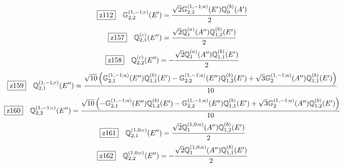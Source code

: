 \documentclass[fleqn,10pt,landscape]{jsarticle}
\begin{document}
\begin{dmath*}
\hspace*{3mm}\fbox{z112}\quad \mathbb{G}_{2,2}^{(1,-1;c)}(E^{\prime})=\frac{\sqrt{2} \mathbb{G}_{2,2}^{(1,-1;a)}(E^{\prime}) \mathbb{Q}_{0}^{(b)}(A^{\prime})}{2}
\end{dmath*}
\begin{dmath*}
\hspace*{3mm}\fbox{z157}\quad \mathbb{Q}_{2,1}^{(c)}(E^{\prime\prime})=\frac{\sqrt{2} \mathbb{Q}_{1}^{(a)}(A^{\prime\prime}) \mathbb{Q}_{1,2}^{(b)}(E^{\prime})}{2}
\end{dmath*}
\begin{dmath*}
\hspace*{3mm}\fbox{z158}\quad \mathbb{Q}_{2,2}^{(c)}(E^{\prime\prime})=- \frac{\sqrt{2} \mathbb{Q}_{1}^{(a)}(A^{\prime\prime}) \mathbb{Q}_{1,1}^{(b)}(E^{\prime})}{2}
\end{dmath*}
\begin{dmath*}
\hspace*{3mm}\fbox{z159}\quad \mathbb{Q}_{2,1}^{(1,-1;c)}(E^{\prime\prime})=\frac{\sqrt{10} \left(\mathbb{G}_{2,1}^{(1,-1;a)}(E^{\prime\prime}) \mathbb{Q}_{1,1}^{(b)}(E^{\prime}) - \mathbb{G}_{2,2}^{(1,-1;a)}(E^{\prime\prime}) \mathbb{Q}_{1,2}^{(b)}(E^{\prime}) + \sqrt{3} \mathbb{G}_{2}^{(1,-1;a)}(A^{\prime\prime}) \mathbb{Q}_{1,1}^{(b)}(E^{\prime})\right)}{10}
\end{dmath*}
\begin{dmath*}
\hspace*{3mm}\fbox{z160}\quad \mathbb{Q}_{2,2}^{(1,-1;c)}(E^{\prime\prime})=\frac{\sqrt{10} \left(- \mathbb{G}_{2,1}^{(1,-1;a)}(E^{\prime\prime}) \mathbb{Q}_{1,2}^{(b)}(E^{\prime}) - \mathbb{G}_{2,2}^{(1,-1;a)}(E^{\prime\prime}) \mathbb{Q}_{1,1}^{(b)}(E^{\prime}) + \sqrt{3} \mathbb{G}_{2}^{(1,-1;a)}(A^{\prime\prime}) \mathbb{Q}_{1,2}^{(b)}(E^{\prime})\right)}{10}
\end{dmath*}
\begin{dmath*}
\hspace*{3mm}\fbox{z161}\quad \mathbb{Q}_{2,1}^{(1,0;c)}(E^{\prime\prime})=\frac{\sqrt{2} \mathbb{Q}_{1}^{(1,0;a)}(A^{\prime\prime}) \mathbb{Q}_{1,2}^{(b)}(E^{\prime})}{2}
\end{dmath*}
\begin{dmath*}
\hspace*{3mm}\fbox{z162}\quad \mathbb{Q}_{2,2}^{(1,0;c)}(E^{\prime\prime})=- \frac{\sqrt{2} \mathbb{Q}_{1}^{(1,0;a)}(A^{\prime\prime}) \mathbb{Q}_{1,1}^{(b)}(E^{\prime})}{2}
\end{dmath*}
\end{document}
